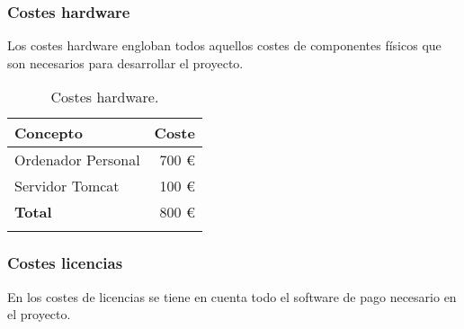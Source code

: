 \subsubsection{Costes hardware}

Los costes hardware engloban todos aquellos costes de componentes físicos que son necesarios para desarrollar el proyecto.

\begin{longtable}[]{@{}lr@{}}
\toprule
\begin{minipage}[b]{0.38\columnwidth}\raggedright\strut
\textbf{Concepto}\strut
\end{minipage} & \begin{minipage}[b]{0.20\columnwidth}\raggedright\strut
\textbf{Coste}\strut
\end{minipage}\tabularnewline
\midrule
\endhead

\begin{minipage}[t]{0.38\columnwidth}\raggedright\strut
Ordenador Personal \cite{pago:pc} \strut
\end{minipage} & \begin{minipage}[t]{0.20\columnwidth}\raggedright\strut
700 \euro{}\strut
\end{minipage}\tabularnewline

\begin{minipage}[t]{0.38\columnwidth}\raggedright\strut
Servidor Tomcat \cite{tom:server} \strut
\end{minipage} & \begin{minipage}[t]{0.20\columnwidth}\raggedright\strut
100 \euro{}\strut
\end{minipage}\tabularnewline

\midrule

\begin{minipage}[t]{0.38\columnwidth}\raggedright\strut
\textbf{Total}\strut
\end{minipage} & \begin{minipage}[t]{0.20\columnwidth}\raggedright\strut
800 \euro{}\strut
\end{minipage}\tabularnewline
\bottomrule
\caption{Costes hardware.}
\end{longtable}

\subsubsection{Costes licencias}

En los costes de licencias se tiene en cuenta todo el software de pago necesario en el proyecto.

